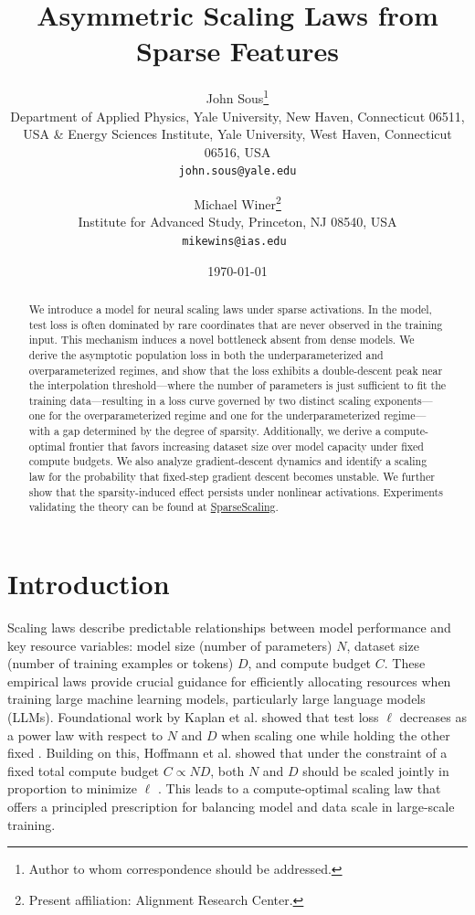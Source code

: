 \documentclass[11pt]{article}
\title{Asymmetric Scaling Laws from Sparse Features}
\author{%
  John Sous\thanks{Author to whom correspondence should be addressed.}\\
   Department of Applied Physics, Yale University, New Haven, Connecticut 06511, USA \& 
Energy Sciences Institute, Yale University, West Haven, Connecticut 06516, USA\\
   \texttt{john.sous@yale.edu} \\

     \and
     
  Michael Winer\thanks{Present affiliation: Alignment Research Center.}\\
  Institute for Advanced Study, Princeton, NJ 08540, USA\\
  \texttt{mikewins@ias.edu } \\
}
\date{\today}
\theoremstyle{plain}
\theoremstyle{definition}
\theoremstyle{remark}
\newcommand{\JSCheck}[1]{#1}
\begin{document}
\maketitle

\vspace{-6mm}

\begin{abstract}
We introduce a model for neural scaling laws under sparse activations. In the model, test loss is often dominated by rare coordinates that are never observed in the training input. This mechanism induces a novel bottleneck absent from dense models. We derive the asymptotic \JSCheck{population} loss in both the underparameterized and overparameterized regimes, and show that the loss exhibits a double-descent peak near the interpolation threshold---where the number of parameters is just sufficient to fit the training data---resulting in a loss curve governed by two distinct scaling exponents---one for the overparameterized regime and one for the underparameterized regime---with a gap determined by the degree of sparsity. Additionally, we derive a compute-optimal frontier that favors increasing dataset size over model capacity under fixed compute budgets. \JSCheck{We also analyze gradient-descent dynamics and identify a scaling law for the probability that fixed-step gradient descent becomes unstable.} \JSCheck{We further show that the sparsity-induced effect persists under nonlinear activations.} Experiments validating the theory can be found at \href{https://anonymous.4open.science/r/sparse-scaling-neurips2026-3CDB/SparseScaling1.ipynb}{SparseScaling}.
\end{abstract}


\vspace{-2mm}

\section{Introduction}
\label{intro}

Scaling laws describe predictable relationships between model performance and key resource variables: model size (number of parameters) $N$, dataset size (number of training examples or tokens) $D$, and compute budget $C$. These empirical laws provide crucial guidance for efficiently allocating resources when training large machine learning models, particularly large language models (LLMs). Foundational work by Kaplan et al. showed that test loss $\ell$ decreases as a power law with respect to $N$ and $D$ when scaling one while holding the other fixed \citep{Kaplan2020ScalingLaws}. Building on this, Hoffmann et al. showed that under the constraint of a fixed total compute budget $C \propto N D$, both $N$ and $D$ should be scaled jointly in proportion to minimize $\ell$ \citep{Hoffmann2022Chinchilla}. This leads to a compute-optimal scaling law that offers a principled prescription for balancing model and data scale in large-scale training.
\end{document}
